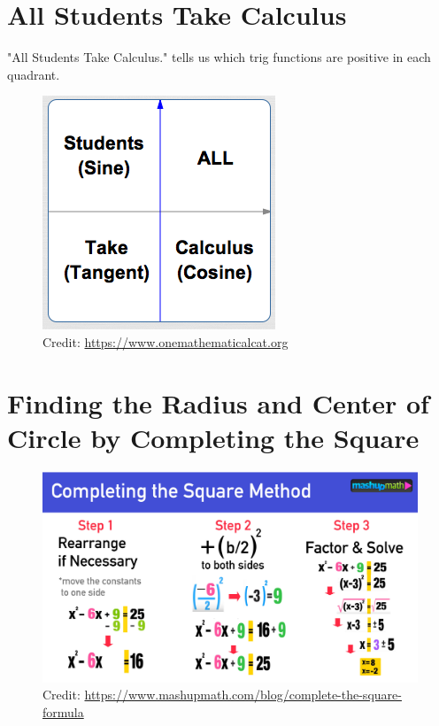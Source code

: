 \documentclass[12pt]{article}
\begin{document}
\section{All Students Take Calculus}

"All Students Take Calculus." tells us which trig functions are positive in each quadrant.\\

\begin{figure}[ht]
	\centering
	\includegraphics[scale=.75]{memoryDeviceSigns}
	\caption{Credit: \url{https://www.onemathematicalcat.org}}
\end{figure}

\section{Finding the Radius and Center of Circle by Completing the Square}



\begin{figure}[ht]
	\centering
	\includegraphics[scale=.65]{generalsquare.jpg}
	\caption{Credit: \url{https://www.mashupmath.com/blog/complete-the-square-formula}}
\end{figure}
\end{document}

